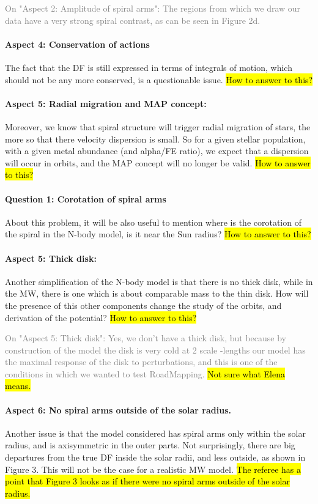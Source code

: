 \documentclass[10pt,a4paper]{article}
\newcommand{\Answer}[1]{\textcolor{Gray}{#1}}
\begin{document}
\Answer{On "Aspect 2: Amplitude of spiral arms": The regions from which we draw our data have a very strong spiral contrast, as can be seen in Figure 2d.}

\paragraph{Aspect 4: Conservation of actions} The fact that the DF is still expressed in terms of integrals of motion, which should not be any more conserved, is a questionable issue. \hl{How to answer to this?}

\paragraph{Aspect 5: Radial migration and MAP concept:} Moreover, we know that spiral structure will trigger radial migration of stars, the
more so that there velocity dispersion is small. So for a given stellar population,
with a given metal abundance (and alpha/FE ratio), we expect that a dispersion will
occur in orbits, and the MAP concept will no longer be valid. \hl{How to answer to this?}

\paragraph{Question 1: Corotation of spiral arms} About this problem, it will be also useful to mention where is the corotation of the
spiral in the N-body model, is it near the Sun radius? \hl{How to answer to this?}

\paragraph{Aspect 5: Thick disk:} Another simplification of the N-body model is that there is no thick disk, while in
the MW, there is one which is about comparable mass to the thin disk. How will the
presence of this other components change the study of the orbits, and derivation of
the potential? \hl{How to answer to this?} 

\Answer{On "Aspect 5: Thick disk": Yes, we don't have a thick 
disk, but because by construction of the model the disk is very cold at 
2 scale -lengths our model has the maximal response of the disk to 
perturbations, and this is one of the conditions in which we wanted to 
test RoadMapping.} \hl{Not sure what Elena means.}

\paragraph{Aspect 6: No spiral arms outside of the solar radius.} Another issue is that the model considered has spiral arms only within the solar
radius, and is axisymmetric in the outer parts. Not surprisingly, there are big
departures from the true DF inside the solar radii, and less outside, as shown in
Figure 3. This will not be the case for a realistic MW model. \hl{The referee has a point that Figure 3 looks as if there were no spiral arms outside of the solar radius.}
\end{document}
